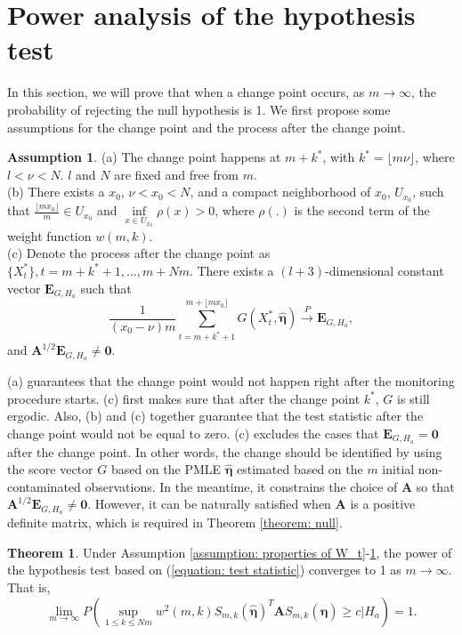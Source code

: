 \documentclass{article}
\theoremstyle{definition}
\newtheorem{theorem}{Theorem}[section]
\newtheorem{assumption}{Assumption}
\begin{document}
\section{Power analysis of the hypothesis test}
\label{sec: power analysis}
In this section, we will prove that when a change point occurs, as $m \rightarrow \infty$, the probability of rejecting the null hypothesis is 1. 
We first propose some assumptions for the change point and the process after the change point.
\begin{assumption}
\label{assumption: power analysis}
(a) The change point happens at $m+k^*$, with $k^* = \lfloor m \nu \rfloor$, where $l<\nu<N$. $l$ and $N$ are fixed and free from $m$. \\
(b) There exists a $x_0$, $\nu<x_0<N$, and a compact neighborhood of $x_0$, $U_{x_0}$, such that $\frac{\lfloor mx_0 \rfloor}{m} \in U_{x_0}$ and $\underset{x \in U_{x_0}}{\inf}\rho(x)>0$, where $\rho(.)$ is the second term of the weight function $
w(m,k)$. \\
(c) Denote the process after the change point as $\{X_t^*\}, t = m+k^*+1,...,m+Nm$. There exists a $(l+3)$-dimensional constant vector $\bm{E}_{G,H_a}$ such that
\begin{equation*}
    \frac{1}{(x_0-\nu)m}\sum_{t=m+k^*+1}^{m+\lfloor mx_0 \rfloor}G(X^*_t, \hat{\bm{\eta}}) \overset{P}{\rightarrow}\bm{E}_{G,H_a},
\end{equation*}
and $\bm{A}^{1/2}\bm{E}_{G,H_a} \neq \bm{0}$.
\end{assumption}
(a) guarantees that the change point would not happen right after the monitoring procedure starts. (c) first makes sure that after the change point $k^*$, $G$ is still ergodic. Also, (b) and (c) together guarantee that the test statistic after the change point would not be equal to zero. (c) excludes the cases that $\bm{E}_{G,H_a} = \bm{0}$ after the change point. In other words, the change should be identified by using the score vector $G$ based on the PMLE $\hat{\bm{\eta}}$ estimated based on the $m$ initial non-contaminated observations. In the meantime, it constrains the choice of $\bm{A}$ so that $\bm{A}^{1/2}\bm{E}_{G,H_a} \neq \bm{0}$. However, it can be naturally satisfied when $\bm{A}$ is a positive definite matrix, which is required in Theorem \ref{theorem: null}.
\begin{theorem}
\label{theorem: power analysis}
Under Assumption \ref{assumption: properties of W_t}-\ref{assumption: power analysis}, the power of the hypothesis test based on (\ref{equation: test statistic}) converges to 1 as $m\rightarrow \infty$. That is,
\begin{equation*}
    \underset{m \rightarrow \infty}{\lim}P\left(\underset{1\leq k \leq Nm}{\sup} w^2(m,k)S_{m,k}(\hat{\bm{\eta}})^T\bm{A}S_{m,k}(\hat{\bm{\eta}}) \geq c  |H_a  \right) = 1.
\end{equation*}
\end{theorem}
\end{document}
